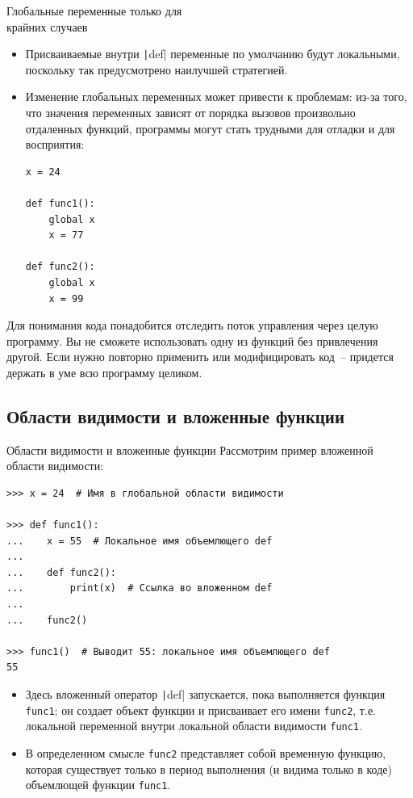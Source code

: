 \documentclass[aspectratio=169]{beamer}%
\begin{document}
\begin{frame}[fragile]{Глобальные переменные только для \\ крайних случаев}
\scriptsize
\begin{itemize}
\item Присваиваемые внутри \texttt|def| переменные по умолчанию будут локальными, поскольку так предусмотрено наилучшей стратегией. 
\item Изменение глобальных переменных может привести к проблемам: из-за того, что значения переменных зависят от порядка вызовов произвольно отдаленных функций, программы могут стать трудными для отладки и для восприятия:

\begin{verbatim}
x = 24

def func1():
    global x
    x = 77

def func2():
    global x
    x = 99
\end{verbatim}
\end{itemize}

Для понимания кода понадобится отследить поток управления через целую программу. Вы не сможете использовать одну из функций без привлечения другой. Если нужно повторно применить или модифицировать код~-- придется держать в уме всю программу целиком.
\vfill
\end{frame}


\subsection{Области видимости и вложенные функции}

\begin{frame}[fragile]{Области видимости и вложенные функции}
\scriptsize
Рассмотрим пример вложенной области видимости:

\begin{verbatim}
>>> x = 24  # Имя в глобальной области видимости

>>> def func1():
...    x = 55  # Локальное имя объемлющего def
...
...    def func2():
...        print(x)  # Ссылка во вложенном def
...
...    func2()

>>> func1()  # Выводит 55: локальное имя объемлющего def
55
\end{verbatim}
\begin{itemize}
\item Здесь вложенный оператор \texttt|def| запускается, пока выполняется функция \texttt{func1}; он создает объект функции и присваивает его имени \texttt{func2}, т.е. локальной переменной внутри локальной области видимости \texttt{func1}. 
\item В определенном смысле \texttt{func2} представляет собой временную функцию, которая существует только в период выполнения (и видима только в коде) объемлющей функции \texttt{func1}.
\end{itemize}
\vfill
\end{frame}
\end{document}
